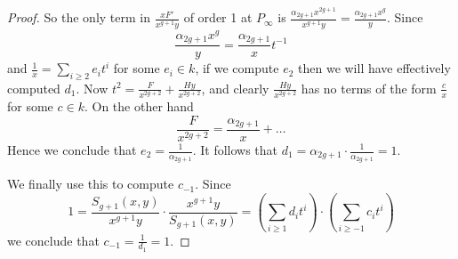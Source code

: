 \begin{proof}
So the only term in $\frac{xF'}{x^{g+1}y}$ of order 1 at $P_\infty$ is $\frac{\alpha_{2g+1}x^{2g+1}}{x^{g+1}y} = \frac{\alpha_{2g+1}x^{g}}{y}$.
Since
\[
\frac{\alpha_{2g+1}x^g}{y} = \frac{\alpha_{2g+1}}{x}t^{-1}
\]
and $\frac{1}{x} = \sum_{i\geq 2}e_it^i$ for some $e_i \in k$, if we compute $e_2$ then we will have effectively computed $d_1$.
Now $t^2 = \frac{F }{x^{2g+2}}+ \frac{Hy}{x^{2g+2}}$, and clearly $\frac{Hy}{x^{2g+2}}$ has no terms of the form $\frac{c}{x}$ for some $c \in k$.
On the other hand
\[
\frac{F}{x^{2g+2}} = \frac{\alpha_{2g+1}}{x} + \ldots
\]
Hence we conclude that $e_2 = \frac{1}{\alpha_{2g+1}}$.
It follows that $d_1 = \alpha_{2g+1} \cdot \frac{1}{\alpha_{2g+1}} = 1$.


We finally use this to compute $c_{-1}$.
Since 
\begin{equation*}
1 = \frac{S_{g+1}(x,y)}{x^{g+1}y}\cdot \frac{x^{g+1}y}{S_{g+1}(x,y)} = \left( \sum_{i\geq 1}d_it^i \right) \cdot \left( \sum_{i\geq -1}c_it^i\right)
\end{equation*}
we conclude that $c_{-1} = \frac{1}{d_{1}} = 1$.




\end{proof}
